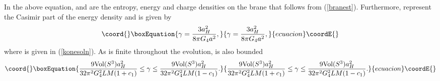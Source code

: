 \documentclass[a4paper,11pt]{article}
\begin{document}
In the above equation, \coordHE{} and \myHighlight{$\tilde \rho$}\coordHE{} are the entropy, 
energy and charge densities on the brane that follows from 
(\ref{branest}). Furthermore, 
\myHighlight{$\gamma$}\coordHE{} represent the Casimir part of the energy density \cite{SV}
and is given by 
\begin{equation}\coord{}\boxEquation{
\gamma = {3 a_H^2\over{8\pi G_4 a^2}},
\label{ce}
}{
\gamma = {3 a_H^2\over{8\pi G_4 a^2}},
}{ecuacion}\coordE{}\end{equation}
where \coordHE{} is given in (\ref{konesoln}). As \coordHE{} is finite throughout the 
evolution, \myHighlight{$\gamma$}\coordHE{} is also bounded
\begin{equation}\coord{}\boxEquation{
{9 {\rm Vol}(S^3) a_H^2 \over{ 32 \pi^2 G_4^2 L M(1+c_1)}} \le 
\gamma
\le {9 {\rm Vol}(S^3) a_H^2 \over{ 32 \pi^2 G_4^2 L M (1-c_1)}}.
}{
{9 {\rm Vol}(S^3) a_H^2 \over{ 32 \pi^2 G_4^2 L M(1+c_1)}} \le 
\gamma
\le {9 {\rm Vol}(S^3) a_H^2 \over{ 32 \pi^2 G_4^2 L M (1-c_1)}}.
}{ecuacion}\coordE{}\end{equation}
\end{document}
